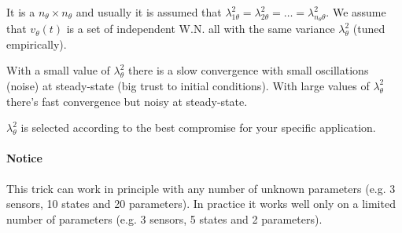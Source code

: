 It is a $n_\theta\times n_\theta$ and usually it is assumed that $\lambda_{1\theta}^2=\lambda_{2\theta}^2=\dots=\lambda_{n_\theta\theta}^2$.
We assume that $v_\theta(t)$ is a set of independent W.N. all with the same variance $\lambda_\theta^2$ (tuned empirically).


With a small value of $\lambda_\theta^2$ there is a slow convergence with small oscillations (noise) at steady-state (big trust to initial conditions).
With large values of $\lambda_\theta^2$ there's fast convergence but noisy at steady-state.

$\lambda_\theta^2$ is selected according to the best compromise for your specific application.

\paragraph{Notice} This trick can work in principle with any number of unknown parameters (e.g. 3 sensors, 10 states and 20 parameters).
In practice it works well only on a limited number of parameters (e.g. 3 sensors, 5 states and 2 parameters).

